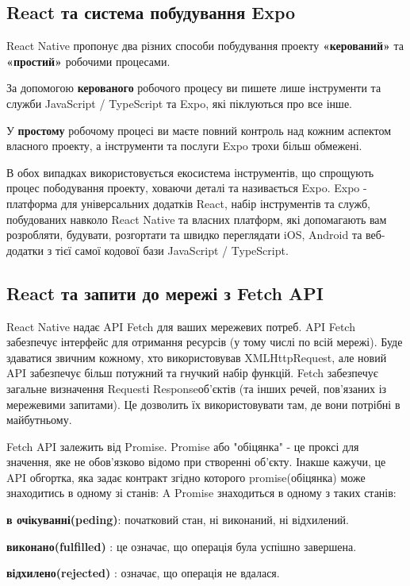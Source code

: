 \subsection{React та система побудування Expo}
\label{subsec:rn_expo}
React Native пропонує два різних способи побудування проекту \textbf{«керований»} та \textbf{«простий»} робочими процесами.
\begin{itemize}
    \begin{item}
        За допомогою \textbf{керованого} робочого процесу ви пишете лише інструменти та служби JavaScript / TypeScript та Expo, які піклуються про все інше.
    \end{item}
    \begin{item}
        У \textbf{простому} робочому процесі ви маєте повний контроль над кожним аспектом власного проекту, а інструменти та послуги Expo трохи більш обмежені.
    \end{item}
\end{itemize}

В обох випадках використовується екосистема інструментів, що спрощують процес пободування проекту, ховаючи деталі та називається Expo.
Expo - платформа для універсальних додатків React, набір інструментів та служб, побудованих навколо React Native та власних платформ, які допомагають вам розробляти, будувати, розгортати та швидко переглядати iOS, Android та веб-додатки з тієї самої кодової бази JavaScript / TypeScript.\cite{expo_doc}

\subsection{React та запити до мережі з Fetch API}
\label{subsec:rn_fetch_api}
React Native надає API Fetch для ваших мережевих потреб.
API Fetch забезпечує інтерфейс для отримання ресурсів (у тому числі по всій мережі).
Буде здаватися звичним кожному, хто використовував XMLHttpRequest, але новий API забезпечує більш потужний та гнучкий набір функцій.
Fetch забезпечує загальне визначення Requestі Responseоб'єктів (та інших речей, пов'язаних із мережевими запитами).
Це дозволить їх використовувати там, де вони потрібні в майбутньому.

Fetch API залежить від Promise.
Promise або "обіцянка" - це проксі для значення, яке не обов'язково відомо при створенні об'єкту.\cite{promise_doc}
Інакше кажучи, це API обгортка, яка задає контракт згідно которого promise(обіцянка) може знаходитись в одному зі станів:
A Promise знаходиться в одному з таких станів:
\begin{itemize}
    \begin{item}
        \textbf{в очікуванні(peding)}: початковий стан, ні виконаний, ні відхилений.
    \end{item}
    \begin{item}
        \textbf{виконано(fulfilled)} : це означає, що операція була успішно завершена.
    \end{item}
    \begin{item}
        \textbf{відхилено(rejected)} : означає, що операція не вдалася.
    \end{item}
\end{itemize}

